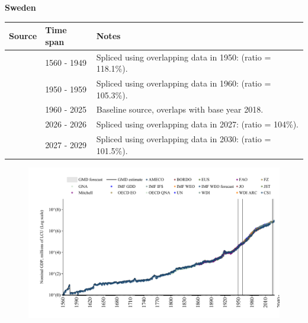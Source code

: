 \documentclass[12pt,a4paper,landscape]{article}
\begin{document}
\begin{adjustbox}{max totalsize={\paperwidth}{\paperheight},center}
\begin{minipage}[t][\textheight][t]{\textwidth}
\vspace*{0.5cm}
{}
\begin{center}
{\Large\bfseries Sweden}
\end{center}
\vspace{0.5cm}
\begin{table}[H]
\centering
\small
\begin{tabular}{|l|l|l|}
\hline
\textbf{Source} & \textbf{Time span} & \textbf{Notes} \\
\hline
\rowcolor{white}\cite{CS1_SWE}& 1560 - 1949 &Spliced using overlapping data in 1950: (ratio = 118.1\%).\\
\rowcolor{lightgray}\cite{IMF_GDD}& 1950 - 1959 &Spliced using overlapping data in 1960: (ratio = 105.3\%).\\
\rowcolor{white}\cite{OECD_EO}& 1960 - 2025 &Baseline source, overlaps with base year 2018.\\
\rowcolor{lightgray}\cite{AMECO}& 2026 - 2026 &Spliced using overlapping data in 2027: (ratio = 104\%).\\
\rowcolor{white}\cite{IMF_WEO_forecast}& 2027 - 2029 &Spliced using overlapping data in 2030: (ratio = 101.5\%).\\
\hline
\end{tabular}
\end{table}
\begin{figure}[H]
\centering
\includegraphics[width=\textwidth,height=0.6\textheight,keepaspectratio]{graphs/SWE_nGDP.pdf}
\end{figure}
\end{minipage}
\end{adjustbox}
\end{document}
